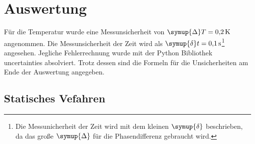 \section{Auswertung}
\label{sec:Auswertung}
Für die Temperatur wurde eine Messunsicherheit von $\symup{\Delta} T = \SI{0.2}{\kelvin}$ angenommen. Die Messunsicherheit der Zeit wird als
$\symup{\delta} t = \SI{0.1}{\second}$\footnote{Die Messunicherheit der Zeit wird mit dem kleinen $\symup{\delta}$ beschrieben, 
da das große $\symup{\Delta}$ für die Phasendifferenz gebraucht wird.} angesehen. Jegliche Fehlerrechnung wurde mit der Python Bibliothek 
uncertainties \cite{uncertainties} absolviert. Trotz dessen sind die Formeln für die Unsicherheiten am Ende der Auswertung angegeben. 
\subsection{Statisches Vefahren}  

